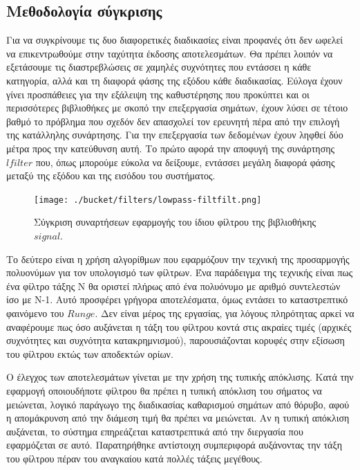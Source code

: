 \documentclass[breaklines=true, 12pt]{article}
\begin{document}
{{{\clearpage
\subsection{Μεθοδολογία σύγκρισης}
\label{sec:orga0b7eee}
Για να συγκρίνουμε τις δυο διαφορετικές διαδικασίες είναι προφανές ότι δεν
ωφελεί να επικεντρωθούμε στην ταχύτητα έκδοσης αποτελεσμάτων. Θα πρέπει λοιπόν
να εξετάσουμε τις διαστρεβλώσεις σε χαμηλές συχνότητες που εντάσσει η κάθε
κατηγορία, αλλά και τη διαφορά φάσης της εξόδου κάθε διαδικασίας. Εύλογα έχουν
γίνει προσπάθειες για την εξάλειψη της καθυστέρησης που προκύπτει και οι
περισσότερες βιβλιοθήκες με σκοπό την επεξεργασία σημάτων, έχουν λύσει σε
τέτοιο βαθμό το πρόβλημα που σχεδόν δεν απασχολεί τον ερευνητή πέρα από την
επιλογή της κατάλληλης συνάρτησης. Για την επεξεργασία των δεδομένων έχουν ληφθεί
δύο μέτρα προς την κατεύθυνση αυτή. Το πρώτο αφορά την αποφυγή της συνάρτησης
\(lfilter\) που, όπως μπορούμε εύκολα να δείξουμε, εντάσσει μεγάλη διαφορά φάσης
μεταξύ της εξόδου και της εισόδου του συστήματος.

\begin{figure}[htbp]
\centering
\texttt{[image: ./bucket/filters/lowpass-filtfilt.png]}
\caption{Σύγκριση συναρτήσεων εφαρμογής του ίδιου φίλτρου της βιβλιοθήκης \(signal\).}
\end{figure}

Το δεύτερο είναι η χρήση αλγορίθμων που εφαρμόζουν την τεχνική της προσαρμογής
πολυονύμων για τον υπολογισμό των φίλτρων. Ένα παράδειγμα της τεχνικής είναι
πως ένα φίλτρο τάξης Ν θα οριστεί πλήρως από ένα πολυόνυμο με αριθμό
συντελεστών ίσο με Ν-1. Αυτό προσφέρει γρήγορα αποτελέσματα, όμως εντάσει το
καταστρεπτικό φαινόμενο του \(Runge\). Δεν είναι μέρος της εργασίας, για λόγους
πληρότητας αρκεί να αναφέρουμε πως όσο αυξάνεται η τάξη του φίλτρου κοντά
στις ακραίες τιμές (αρχικές συχνότητες και συχνότητα κατακρημνισμού),
παρουσιάζονται κορυφές στην εξίσωση του φίλτρου εκτώς των αποδεκτών ορίων.

\clearpage
Ο έλεγχος των αποτελεσμάτων γίνεται με την χρήση της τυπικής απόκλισης. Κατά
την εφαρμογή οποιουδήποτε φίλτρου θα πρέπει η τυπική απόκλιση του σήματος να
μειώνεται, λογικό παράγωγο της διαδικασίας καθαρισμού σημάτων από θόρυβο, αφού
η απομάκρυνση από την διάμεση τιμή θα πρέπει να μειώνεται. Αν η τυπική απόκλιση
αυξάνεται, το σύστημα επηρεάζεται καταστρεπτικά από την διεργασία που
εφαρμόζεται σε αυτό. Παρατηρήθηκε αντίστοιχη συμπεριφορά αυξάνοντας την τάξη
του φίλτρου πέραν του αναγκαίου κατά πολλές τάξεις μεγέθους.

}}}
\end{document}

